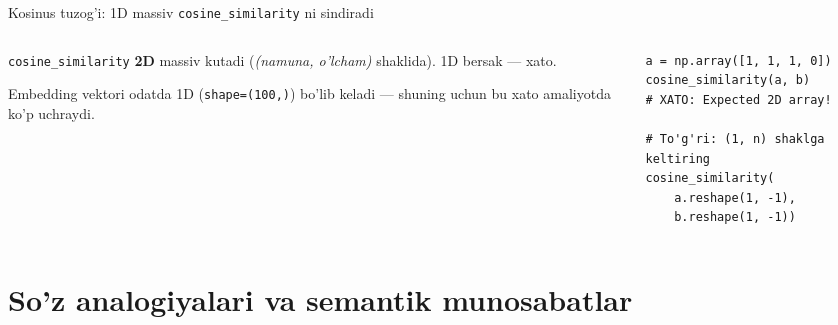 \documentclass[aspectratio=169,11pt]{beamer}
\begin{document}
\begin{frame}[fragile]{Kosinus tuzog'i: 1D massiv \texttt{cosine\_similarity} ni sindiradi}
  \begin{columns}[T]
    \begin{column}{0.50\textwidth}
      \begin{tcolorbox}[warnbox,title=Haqiqiy xato --- tez-tez uchraydi]
        \small
        \texttt{cosine\_similarity} \textbf{2D} massiv kutadi
        (\textit{(namuna, o'lcham)} shaklida). 1D bersak --- xato.
      \end{tcolorbox}
      \vspace{3pt}
      \footnotesize\color{halfgray}
      Embedding vektori odatda 1D (\texttt{shape=(100,)}) bo'lib
      keladi --- shuning uchun bu xato amaliyotda ko'p uchraydi.
    \end{column}
    \begin{column}{0.46\textwidth}
      \begin{lstlisting}[numbers=none,frame=single,
                         basicstyle=\ttfamily\scriptsize]
a = np.array([1, 1, 1, 0])
cosine_similarity(a, b)
# XATO: Expected 2D array!

# To'g'ri: (1, n) shaklga keltiring
cosine_similarity(
    a.reshape(1, -1),
    b.reshape(1, -1))
      \end{lstlisting}
    \end{column}
  \end{columns}
\end{frame}

\section[Analogiyalar]{So'z analogiyalari va semantik munosabatlar}
\end{document}
